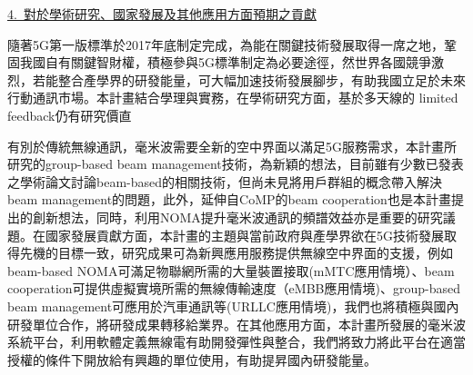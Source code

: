 \documentclass[a4paper,12pt]{article}%
\newcommand\n{\mbox{\quad}} %
\begin{document}
\vspace{1em}%
\noindent \underline{4.~對於學術研究、國家發展及其他應用方面預期之貢獻}

隨著5G第一版標準於2017年底制定完成，為能在關鍵技術發展取得一席之地，鞏固我國自有關鍵智財權，積極參與5G標準制定為必要途徑，然世界各國競爭激烈，若能整合產學界的研發能量，可大幅加速技術發展腳步，有助我國立足於未來行動通訊市場。本計畫結合學理與實務，在學術研究方面，基於多天線的 limited feedback仍有研究價直

有別於傳統無線通訊，毫米波需要全新的空中界面以滿足5G服務需求，本計畫所研究的group-based beam management技術，為新穎的想法，目前雖有少數已發表之學術論文討論beam-based的相關技術，但尚未見將用戶群組的概念帶入解決beam management的問題，此外，延伸自CoMP的beam cooperation也是本計畫提出的創新想法，同時，利用NOMA提升毫米波通訊的頻譜效益亦是重要的研究議題。在國家發展貢獻方面，本計畫的主題與當前政府與產學界欲在5G技術發展取得先機的目標一致，研究成果可為新興應用服務提供無線空中界面的支援，例如beam-based NOMA可滿足物聯網所需的大量裝置接取(mMTC應用情境）、beam cooperation可提供虛擬實境所需的無線傳輸速度（eMBB應用情境)、group-based beam management可應用於汽車通訊等(URLLC應用情境)，我們也將積極與國內研發單位合作，將研發成果轉移給業界。在其他應用方面，本計畫所發展的毫米波系統平台，利用軟體定義無線電有助開發彈性與整合，我們將致力將此平台在適當授權的條件下開放給有興趣的單位使用，有助提昇國內研發能量。







%
\end{document}
